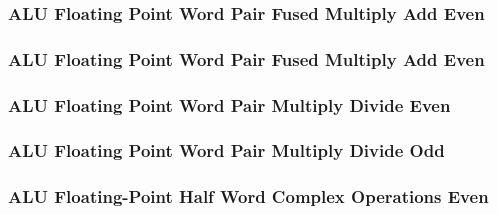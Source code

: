 

\subsubsection[{\small ALU Floating Point Word Pair Fused Multiply Add Even}]{ALU Floating Point Word Pair Fused Multiply Add Even} \label{sec:format-ALU-FWPFMAE}



\subsubsection[{\small ALU Floating Point Word Pair Fused Multiply Add Even}]{ALU Floating Point Word Pair Fused Multiply Add Even} \label{sec:format-ALU-FWPFMAO}



\subsubsection[{\small ALU Floating Point Word Pair Multiply Divide Even}]{ALU Floating Point Word Pair Multiply Divide Even} \label{sec:format-ALU-FWPMULE}



\subsubsection[{\small ALU Floating Point Word Pair Multiply Divide Odd}]{ALU Floating Point Word Pair Multiply Divide Odd} \label{sec:format-ALU-FWPMULO}



\subsubsection[{\small ALU Floating-Point Half Word Complex Operations Even}]{ALU Floating-Point Half Word Complex Operations Even} \label{sec:format-ALU-FHCOPE}


